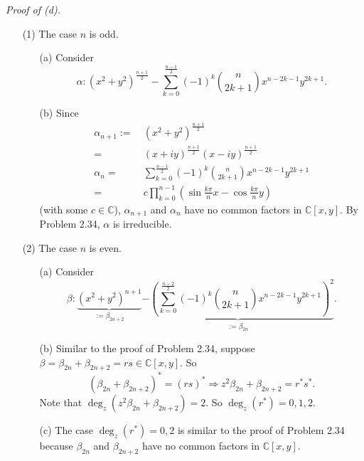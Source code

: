 \documentclass{article}
\begin{document}
\emph{Proof of (d).}
\begin{enumerate}
\item[(1)]
  The case $n$ is odd.
  \begin{enumerate}
  \item[(a)]
    Consider
    \[
      \alpha: (x^2+y^2)^{\frac{n+1}{2}}
      - \sum_{k=0}^{\frac{n-1}{2}}
        (-1)^k {n \choose 2k+1} x^{n-2k-1} y^{2k+1}.
    \]

  \item[(b)]
    Since
    \begin{align*}
      \alpha_{n+1}
      :=& \: (x^2+y^2)^{\frac{n+1}{2}} \\
      =& \: (x + iy)^{\frac{n+1}{2}} (x - iy)^{\frac{n+1}{2}} \\
      \alpha_{n}
      =& \: \sum_{k=0}^{\frac{n-1}{2}} (-1)^k {n \choose 2k+1} x^{n-2k-1} y^{2k+1} \\
      =& \: c \prod_{k=0}^{n-1} \left( \sin\frac{k\pi}{n} x - \cos\frac{k\pi}{n} y \right)
    \end{align*}
    (with some $c \in \mathbb{C}$),
    $\alpha_{n+1}$ and $\alpha_{n}$ have no common factors in $\mathbb{C}[x,y]$.
    By Problem 2.34, $\alpha$ is irreducible.
  \end{enumerate}

\item[(2)]
  The case $n$ is even.
  \begin{enumerate}
  \item[(a)]
    Consider
    \[
      \beta: \underbrace{(x^2+y^2)^{n+1}}_{:= \beta_{2n+2}}
      \underbrace{-\left( \sum_{k=0}^{\frac{n-2}{2}}
        (-1)^k {n \choose 2k+1} x^{n-2k-1} y^{2k+1} \right)^2}_{:= \beta_{2n}}.
    \]

  \item[(b)]
    Similar to the proof of Problem 2.34,
    suppose $\beta = \beta_{2n} + \beta_{2n+2} = rs \in \mathbb{C}[x,y]$.
    So
    \[
      (\beta_{2n} + \beta_{2n+2})^{*} = (rs)^{*}
      \Longrightarrow
      z^2 \beta_{2n} + \beta_{2n+2} = r^{*} s^{*}.
    \]
    Note that $\deg_{z}(z^2 \beta_{2n} + \beta_{2n+2}) = 2$.
    So $\deg_{z}(r^{*}) = 0, 1, 2$.

  \item[(c)]
    The case $\deg_{z}(r^{*}) = 0, 2$ is similar to the proof of Problem 2.34
    because $\beta_{2n}$ and $\beta_{2n+2}$ have no common factors in $\mathbb{C}[x,y]$.


\end{enumerate}
\end{enumerate}
\end{document}
